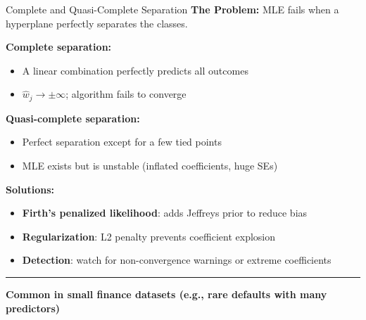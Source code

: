 \documentclass[8pt,aspectratio=169]{beamer}
\newcommand{\bottomnote}[1]{%
\vfill
\vspace{-2mm}
\textcolor{mllavender2}{\rule{\textwidth}{0.4pt}}
\vspace{1mm}
\footnotesize
\textbf{#1}
}
\begin{document}
\begin{frame}[t]{Complete and Quasi-Complete Separation}
\textbf{The Problem:} MLE fails when a hyperplane perfectly separates the classes.

\textbf{Complete separation:}
\begin{itemize}
\item A linear combination perfectly predicts all outcomes
\item $\hat{w}_j \to \pm\infty$; algorithm fails to converge
\end{itemize}

\textbf{Quasi-complete separation:}
\begin{itemize}
\item Perfect separation except for a few tied points
\item MLE exists but is unstable (inflated coefficients, huge SEs)
\end{itemize}

\textbf{Solutions:}
\begin{itemize}
\item \textbf{Firth's penalized likelihood}: adds Jeffreys prior to reduce bias
\item \textbf{Regularization}: L2 penalty prevents coefficient explosion
\item \textbf{Detection}: watch for non-convergence warnings or extreme coefficients
\end{itemize}
\bottomnote{Common in small finance datasets (e.g., rare defaults with many predictors)}
\end{frame}
\end{document}

